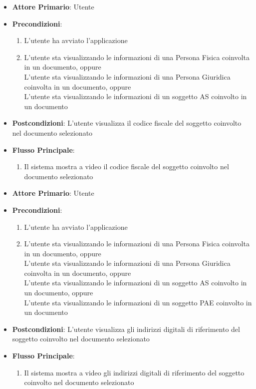 \begin{itemize}
    \item \textbf{Attore Primario}: Utente
    \item \textbf{Precondizioni}:
    \begin{enumerate}
        \item L'utente ha avviato l'applicazione
        \item L'utente sta visualizzando le informazioni di una Persona Fisica coinvolta in un documento, oppure\\L'utente sta visualizzando le informazioni di una Persona Giuridica coinvolta in un documento, oppure\\L'utente sta visualizzando le informazioni di un soggetto AS coinvolto in un documento
    \end{enumerate}
    \item \textbf{Postcondizioni}: L'utente visualizza il codice fiscale del soggetto coinvolto nel documento selezionato
    \item \textbf{Flusso Principale}:
    \begin{enumerate}
        \item Il sistema mostra a video il codice fiscale del soggetto coinvolto nel documento selezionato
    \end{enumerate}
\end{itemize}

\begin{itemize}
    \item \textbf{Attore Primario}: Utente
    \item \textbf{Precondizioni}:
    \begin{enumerate}
        \item L'utente ha avviato l'applicazione
        \item L'utente sta visualizzando le informazioni di una Persona Fisica coinvolta in un documento, oppure\\L'utente sta visualizzando le informazioni di una Persona Giuridica coinvolta in un documento, oppure\\L'utente sta visualizzando le informazioni di un soggetto AS coinvolto in un documento, oppure\\L'utente sta visualizzando le informazioni di un soggetto PAE coinvolto in un documento
    \end{enumerate}
    \item \textbf{Postcondizioni}: L'utente visualizza gli indirizzi digitali di riferimento del soggetto coinvolto nel documento selezionato
    \item \textbf{Flusso Principale}:
    \begin{enumerate}
        \item Il sistema mostra a video gli indirizzi digitali di riferimento del soggetto coinvolto nel documento selezionato
    \end{enumerate}
\end{itemize}

